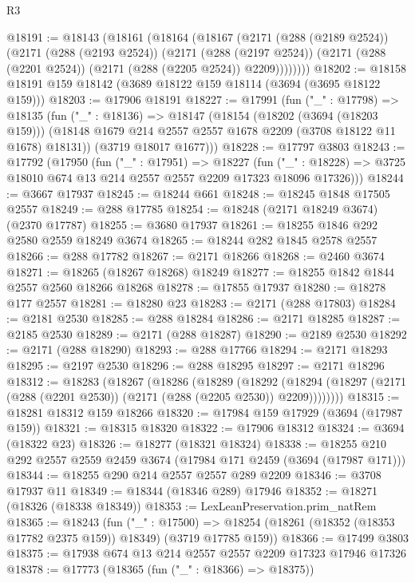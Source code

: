 \begin{lexlean}{R3}
\begin{coremodule}
@18191 := @18143
    (@18161
      (@18164
        (@18167
          (@2171
            (@288 (@2189 @2524))
            (@2171
              (@288 (@2193 @2524))
              (@2171
                (@288 (@2197 @2524))
                (@2171 (@288 (@2201 @2524)) (@2171 (@288 (@2205 @2524)) @2209))))))))
@18202 := @18158 @18191 @159 @18142 (@3689 @18122 @159 @18114 (@3694 (@3695 @18122 @159)))
@18203 := @17906 @18191
@18227 := @17991
    (fun ("_" : @17798) =>
    @18135
      (fun ("_" : @18136) =>
      @18147
        (@18154
          (@18202 (@3694 (@18203 @159)))
          (@18148 @1679 @214 @2557 @2557 @1678 @2209 (@3708 @18122 @11 @1678) @18131))
        (@3719 @18017 @1677)))
@18228 := @17797 @3803
@18243 := @17792
    (@17950
      (fun ("_" : @17951) =>
      @18227
        (fun ("_" : @18228) => @3725 @18010 @674 @13 @214 @2557 @2557 @2209 @17323 @18096 @17326)))
@18244 := @3667 @17937
@18245 := @18244 @661
@18248 := @18245 @1848 @17505 @2557
@18249 := @288 @17785
@18254 := @18248 (@2171 @18249 @3674) (@2370 @17787)
@18255 := @3680 @17937
@18261 := @18255 @1846 @292 @2580 @2559 @18249 @3674
@18265 := @18244 @282 @1845 @2578 @2557
@18266 := @288 @17782
@18267 := @2171 @18266
@18268 := @2460 @3674
@18271 := @18265 (@18267 @18268) @18249
@18277 := @18255 @1842 @1844 @2557 @2560 @18266 @18268
@18278 := @17855 @17937
@18280 := @18278 @177 @2557
@18281 := @18280 @23
@18283 := @2171 (@288 @17803)
@18284 := @2181 @2530
@18285 := @288 @18284
@18286 := @2171 @18285
@18287 := @2185 @2530
@18289 := @2171 (@288 @18287)
@18290 := @2189 @2530
@18292 := @2171 (@288 @18290)
@18293 := @288 @17766
@18294 := @2171 @18293
@18295 := @2197 @2530
@18296 := @288 @18295
@18297 := @2171 @18296
@18312 := @18283
    (@18267
      (@18286
        (@18289
          (@18292
            (@18294 (@18297 (@2171 (@288 (@2201 @2530)) (@2171 (@288 (@2205 @2530)) @2209))))))))
@18315 := @18281 @18312 @159 @18266
@18320 := @17984 @159 @17929 (@3694 (@17987 @159))
@18321 := @18315 @18320
@18322 := @17906 @18312
@18324 := @3694 (@18322 @23)
@18326 := @18277 (@18321 @18324)
@18338 := @18255 @210 @292 @2557 @2559 @2459 @3674 (@17984 @171 @2459 (@3694 (@17987 @171)))
@18344 := @18255 @290 @214 @2557 @2557 @289 @2209
@18346 := @3708 @17937 @11
@18349 := @18344 (@18346 @289) @17946
@18352 := @18271 (@18326 (@18338 @18349))
@18353 := LexLeanPreservation.prim_natRem
@18365 := @18243
    (fun ("_" : @17500) =>
    @18254 (@18261 (@18352 (@18353 @17782 @2375 @159)) @18349) (@3719 @17785 @159))
@18366 := @17499 @3803
@18375 := @17938 @674 @13 @214 @2557 @2557 @2209 @17323 @17946 @17326
@18378 := @17773 (@18365 (fun ("_" : @18366) => @18375))

\end{coremodule}
\end{lexlean}
